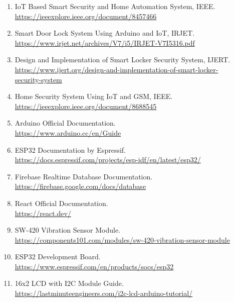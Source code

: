 \documentclass[conference]{IEEEtran}
\begin{document}
\begin{enumerate}

\item IoT Based Smart Security and Home Automation System, IEEE.\\
\url{https://ieeexplore.ieee.org/document/8457466}

\item Smart Door Lock System Using Arduino and IoT, IRJET.\\
\url{https://www.irjet.net/archives/V7/i5/IRJET-V7I5316.pdf}

\item Design and Implementation of Smart Locker Security System, IJERT.\\
\href{https://www.ijert.org/design-and-implementation-of-smart-locker-security-system}
{https://www.ijert.org/design-and-implementation-of-smart-locker-\\security-system}

\item Home Security System Using IoT and GSM, IEEE.\\
\url{https://ieeexplore.ieee.org/document/8688545}

\item Arduino Official Documentation.\\
\url{https://www.arduino.cc/en/Guide}

\item ESP32 Documentation by Espressif.\\
\url{https://docs.espressif.com/projects/esp-idf/en/latest/esp32/}

\item Firebase Realtime Database Documentation.\\
\url{https://firebase.google.com/docs/database}

\item React Official Documentation.\\
\url{https://react.dev/}

\item SW-420 Vibration Sensor Module.\\
\url{https://components101.com/modules/sw-420-vibration-sensor-module}

\item ESP32 Development Board.\\
\url{https://www.espressif.com/en/products/socs/esp32}

\item 16x2 LCD with I2C Module Guide.\\
\url{https://lastminuteengineers.com/i2c-lcd-arduino-tutorial/}

\end{enumerate}
\end{document}
